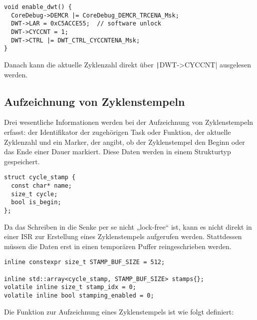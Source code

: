 \begin{code}
\begin{verbatim}
void enable_dwt() {
  CoreDebug->DEMCR |= CoreDebug_DEMCR_TRCENA_Msk;
  DWT->LAR = 0xC5ACCE55;  // software unlock
  DWT->CYCCNT = 1;
  DWT->CTRL |= DWT_CTRL_CYCCNTENA_Msk;
}
\end{verbatim}
\end{code}

Danach kann die aktuelle Zyklenzahl direkt über \texttt|DWT->CYCCNT|
ausgelesen werden.

\subsection{Aufzeichnung von Zyklenstempeln}

Drei wesentliche Informationen werden bei der Aufzeichnung von Zyklenstempeln
erfasst: der Identifikator der zugehörigen Task oder Funktion, der aktuelle
Zyklenzahl und ein Marker, der angibt, ob der Zyklenstempel den Beginn oder das
Ende einer Dauer markiert. Diese Daten werden in einem Strukturtyp gespeichert.

\begin{code}
\begin{verbatim}
struct cycle_stamp {
  const char* name;
  size_t cycle;
  bool is_begin;
};
\end{verbatim}
\end{code}


Da das Schreiben in die Senke per se nicht „lock-free“ ist, kann es nicht direkt
in einer ISR zur Erstellung eines Zyklenstempels aufgerufen werden. Stattdessen
müssen die Daten erst in einen temporären Puffer reingeschrieben werden.

\begin{code}
\begin{verbatim}
inline constexpr size_t STAMP_BUF_SIZE = 512;

inline std::array<cycle_stamp, STAMP_BUF_SIZE> stamps{};
volatile inline size_t stamp_idx = 0;
volatile inline bool stamping_enabled = 0;
\end{verbatim}
\end{code}

Die Funktion zur Aufzeichnung eines Zyklenstempels ist wie folgt definiert:

